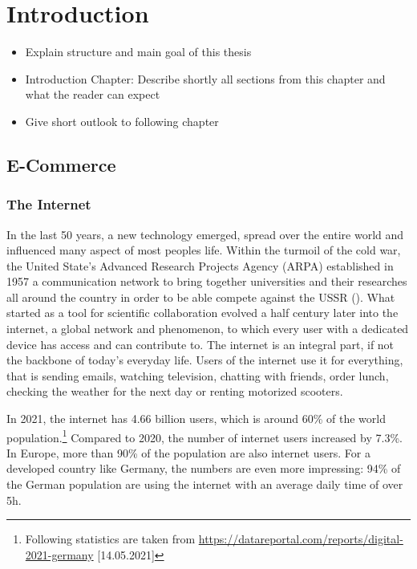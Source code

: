 \chapter{Introduction}

\begin{itemize}
	\item Explain structure and main goal of this thesis
	\item Introduction Chapter: Describe shortly all sections from this chapter and what the reader can expect
	\item Give short outlook to following chapter
\end{itemize}




\section{E-Commerce}


\subsection{The Internet}

In the last 50 years, a new technology emerged, spread over the entire world and influenced many aspect of most peoples life.
Within the turmoil of the cold war, the United State's Advanced Research Projects Agency (ARPA) established in 1957 a communication network to bring together universities and their researches all around the country in order to be able compete against the USSR (\cite{2011Cohen}). %
What started as a tool for scientific collaboration evolved a half century later into the internet, a global network and phenomenon, to which every user with a dedicated device has access and can contribute to.
The internet is an integral part, if not the backbone of today's everyday life.
Users of the internet use it for everything, that is sending emails, watching television, chatting with friends, 
order lunch, checking the weather for the next day or renting motorized scooters.


In 2021, the internet has 4.66 billion users, which is around 60\% of the world population.\footnote{Following statistics are taken from \url{https://datareportal.com/reports/digital-2021-germany} [14.05.2021]}
Compared to 2020, the number of internet users increased by 7.3\%.
In Europe, more than 90\% of the population are also internet users.
For a developed country like Germany, the numbers are even more impressing:
94\% of the German population are using the internet with an average daily time of over 5h.

